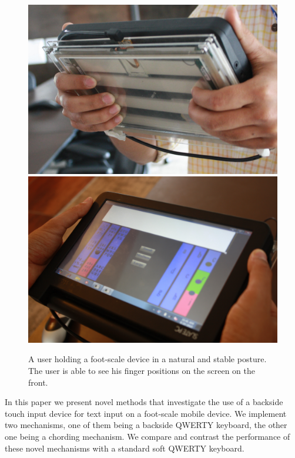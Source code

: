 \begin{figure}
    \includegraphics[scale=0.43]{Figures/natural1.pdf} 
     \includegraphics[scale=0.43]{Figures/natural2.pdf} 
  	\caption{A user holding a foot-scale device in a natural and stable posture. The user is able to see his finger positions on the screen on the front.}
\end{figure}

In this paper we present novel methods that investigate the use of a
backside touch input device for text input on a foot-scale mobile
device. We implement two mechanisms, one of them being a backside
QWERTY keyboard, the other one being a chording mechanism. We compare
and contrast the performance of these novel mechanisms with a standard
soft QWERTY keyboard.
